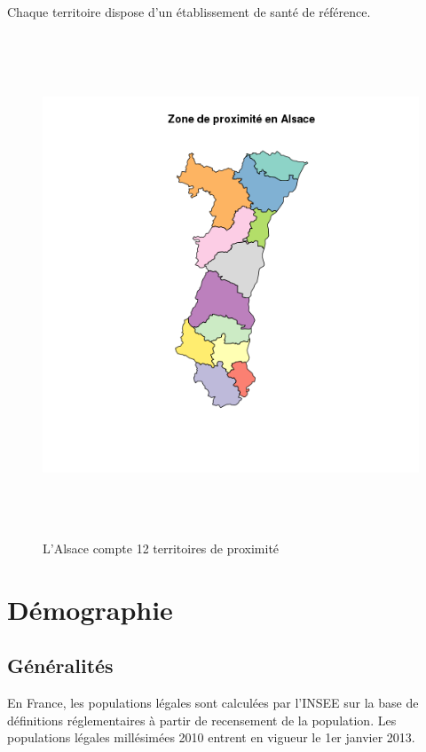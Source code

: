 \documentclass[12pt,english,french,twoside]{report}\usepackage[]{graphicx}\usepackage[]{color}
\begin{document}
Chaque territoire dispose d'un établissement de santé de référence.

\begin{figure}[ht]
 \centering
 \includegraphics[height=15cm,keepaspectratio=true]{../doc/cartographie/RPU2013_Carto_Pop/figure/zone_proximite.png}
 \caption{L'Alsace compte 12 territoires de proximité}
 \label{fig:zp}
\end{figure}

\section{Démographie}
\subsection{Généralités}

En France, les populations légales sont calculées par l'INSEE sur la base de définitions réglementaires à partir de recensement de la population. 
Les populations légales millésimées 2010 entrent en vigueur le 1er janvier 2013.  
\end{document}

